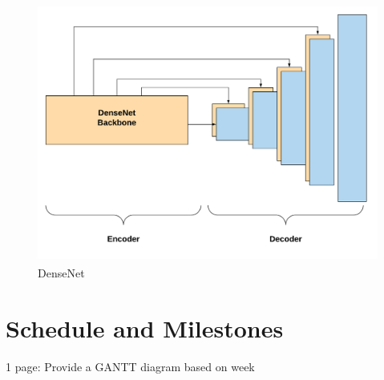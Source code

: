 \begin{figure}[h]
    \centering
    \includegraphics[width = 14cm,  height = 8.5cm]{Figures/A2.png}
    \caption{DenseNet}
    \label{fig:A2-DenseNet-arch}
\end{figure}{}







\section{Schedule and Milestones}
1 page: Provide a GANTT diagram based on week
